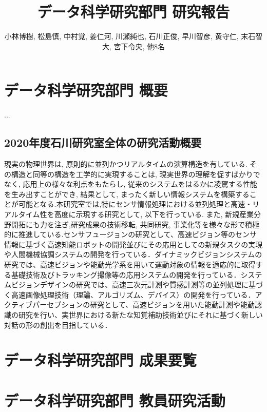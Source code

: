 \documentclass[11pt]{jarticle}
\title{データ科学研究部門 研究報告}
\author{小林博樹, 松島慎, 中村覚, 姜仁河, 川瀬純也, 石川正俊, 早川智彦, 黄守仁, 末石智大, 宮下令央, 他8名}
\begin{document}
\maketitle

\section{データ科学研究部門 概要}
...



\subsection{2020年度石川研究室全体の研究活動概要}
現実の物理世界は, 原則的に並列かつリアルタイムの演算構造を有している. その構造と同等の構造を工学的に実現することは, 現実世界の理解を促すばかりでなく, 応用上の様々な利点をもたらし, 従来のシステムをはるかに凌駕する性能を生み出すことができ, 結果として, まったく新しい情報システムを構築することが可能となる.本研究室では,特にセンサ情報処理における並列処理と高速・リアルタイム性を高度に示現する研究として, 以下を行っている. また, 新規産業分野開拓にも力を注ぎ,研究成果の技術移転, 共同研究, 事業化等を様々な形で積極的に推進している.センサフュージョンの研究として、高速ビジョン等のセンサ情報に基づく高速知能ロボットの開発並びにその応用としての新規タスクの実現や人間機械協調システムの開発を行っている．ダイナミックビジョンシステムの研究では、高速ビジョンや能動光学系を用いて運動対象の情報を適応的に取得する基礎技術及びトラッキング撮像等の応用システムの開発を行っている．システムビジョンデザインの研究では、高速三次元計測や質感計測等の並列処理に基づく高速画像処理技術（理論、アルゴリズム、デバイス）の開発を行っている．アクティブパーセプションの研究として、高速ビジョンを用いた能動計測や能動認識の研究を行い、実世界における新たな知覚補助技術並びにそれに基づく新しい対話の形の創出を目指している．


\section{データ科学研究部門 成果要覧}


\section{データ科学研究部門 教員研究活動}






\end{document}
